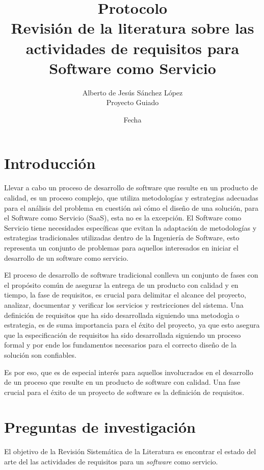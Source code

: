 \documentclass{article}
\begin{document}
  \title{%
  Protocolo \\
  \large Revisión de la literatura sobre las actividades de requisitos para Software como Servicio\\}
  \author{Alberto de Jesús Sánchez López \\ 
  \small Proyecto Guiado}
  \date{Fecha}
  \maketitle
  \thispagestyle{empty}
  \newpage

  \tableofcontents
  \thispagestyle{empty}
  \newpage

\setcounter{page}{1}
\section{Introducción}
Llevar a cabo un proceso de desarrollo de software que resulte en un producto de calidad, es 
un proceso complejo, que utiliza metodologías y estrategias adecuadas para el análisis del problema 
en cuestión asì cómo el diseño de una solución, para el Software como Servicio (SaaS), esta no es la excepción. 
El Software como Servicio tiene necesidades específicas que evitan la adaptación de metodologías y estrategias 
tradicionales utilizadas dentro de la Ingeniería de Software, esto representa un conjunto de problemas para aquellos 
interesados en iniciar el desarrollo de un software como servicio.

El proceso de desarrollo de software tradicional conlleva un conjunto de fases con el propósito común de asegurar la entrega 
de un producto con calidad y en tiempo, la fase de requisitos, es crucial para delimitar el alcance del proyecto, analizar, 
documentar y verificar los servicios y restricciones del sistema. Una definición de requisitos que ha sido desarrollada siguiendo una 
metodogìa o estrategia, es de suma importancia para el éxito del proyecto, ya que esto asegura que la especificación de requisitos ha sido 
desarrollada siguiendo un proceso formal y por ende los fundamentos necesarios para el correcto diseño de la solución son confiables.

Es por eso, que es de especial interés para aquellos involucrados en el desarrollo de un proceso que resulte en un producto de software 
con calidad. Una fase crucial para el éxito de un proyecto de software es la definición de requisitos. 
\newpage

\section{Preguntas de investigación}
El objetivo de la Revisión Sistemática de la Literatura es encontrar el estado del arte del las actividades de requisitos para un \emph{software} como servicio. 
\end{document}
